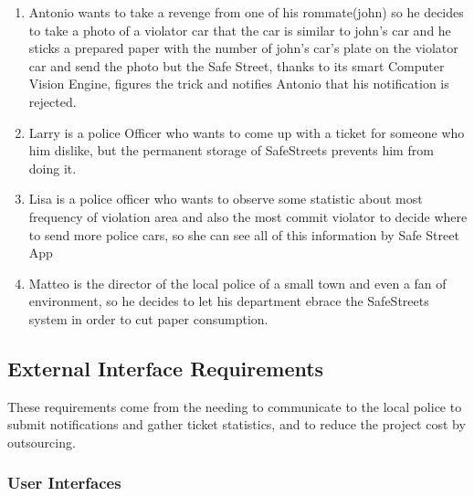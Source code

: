 \documentclass{article}
\newcommand{\enum}[1]{\texttt{#1.\arabic*}}
\begin{document}
\begin{enumerate}[label=\enum{S}]
		\item\label{S:cheating}Antonio wants to take a revenge from one of  his rommate(john) so he decides to take a photo of a violator car that the car is similar to john's car and he sticks a prepared paper with the number of john's car's plate on the violator car and send the photo but the Safe Street, thanks to its smart Computer Vision Engine, figures the trick and notifies Antonio that his notification is rejected.
		\item\label{S:manually ticket}Larry is a police Officer who wants to come up with a ticket for someone who him dislike, but the permanent storage of SafeStreets prevents him from doing it.
		\item \label{S:cityStatistics}Lisa is a police officer who wants to observe some statistic about most frequency of violation area and also the most commit violator to decide where to send more police cars, so she can see all of this information by Safe Street App 
		\item \label{S:environment}Matteo is the director of the local police of a small town and even a fan of environment, so he decides to let his department ebrace the SafeStreets system in order to cut paper consumption.
	\end{enumerate}

\newpage
	\subsection{External Interface Requirements}
		These requirements come from the needing to communicate to the local police to submit notifications and gather ticket statistics, and to reduce the project cost by outsourcing.
		
		\subsubsection{User Interfaces}
		
\end{document}
